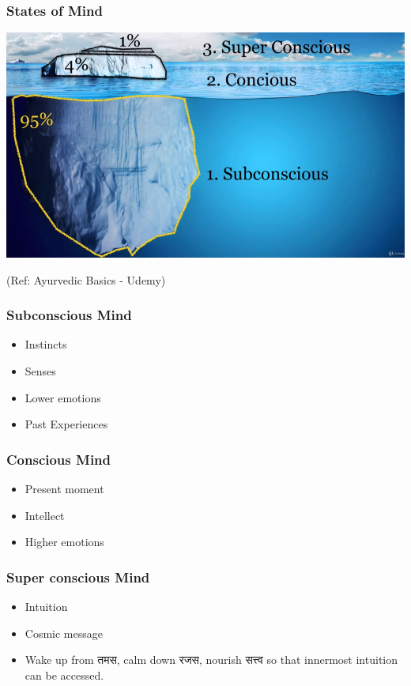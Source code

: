 \begin{frame}[fragile]\frametitle{States of Mind}

\begin{center}
\includegraphics[width=\linewidth,keepaspectratio]{images/mind1}
\end{center}

{\tiny (Ref: Ayurvedic Basics - Udemy)}

\end{frame}

\begin{frame}[fragile]\frametitle{Subconscious Mind}
	\begin{itemize}
	\item Instincts
	\item Senses
	\item Lower emotions
	\item Past Experiences
	\end{itemize}
\end{frame}

\begin{frame}[fragile]\frametitle{Conscious Mind}
	\begin{itemize}
	\item Present moment
	\item Intellect
	\item Higher emotions
	\end{itemize}
\end{frame}


\begin{frame}[fragile]\frametitle{Super conscious Mind}
	\begin{itemize}
	\item Intuition
	\item Cosmic message
	\item Wake up from तमस, calm down रजस, nourish सत्त्व so that innermost intuition can be accessed.
	\end{itemize}
\end{frame}


